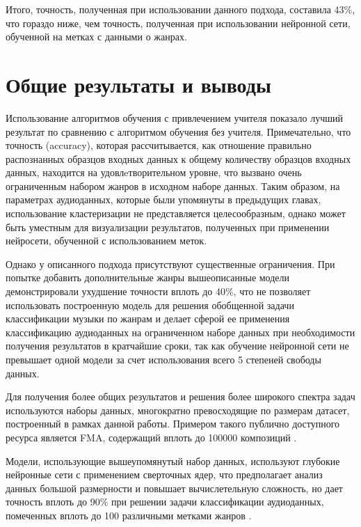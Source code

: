 Итого, точность, полученная при использовании данного подхода, составила $43$\%, что гораздо ниже, чем точность, полученная при использовании нейронной сети, обученной на метках с данными о жанрах.

\section{Общие результаты и выводы}

Использование алгоритмов обучения с привлечением учителя показало лучший результат по сравнению с алгоритмом обучения без учителя.
Примечательно, что точность (accuracy), которая рассчитывается, как отношение правильно распознанных образцов входных данных к общему количеству образцов входных данных, находится на удовлeтворительном уровне, что вызвано
очень ограниченным набором жанров в исходном наборе данных. Таким образом, на параметрах аудиоданных, которые были упомянуты в предыдущих главах, использование кластеризации не представляется целесообразным, однако может быть уместным для визуализации результатов, полученных при применении нейросети, обученной с использованием меток.

Однако у описанного подхода присутствуют существенные ограничения. При попытке добавить дополнительные жанры вышеописанные модели демонстрировали ухудшение точности вплоть до 40\%, что
не позволяет использовать построенную модель для решения обобщенной задачи классификации музыки по жанрам и делает сферой ее применения
классификацию аудиоданных на ограниченном наборе данных при необходимости получения результатов в кратчайшие сроки, так как обучение нейронной сети не превышает одной модели за счет использования всего 5 степеней свободы данных.

Для получения более общих результатов и решения более широкого спектра задач используются наборы данных, многократно превосходящие
по размерам датасет, построенный в рамках данной работы. Примером такого публично доступного ресурса является FMA, содержащий вплоть до 100000 композиций \cite{fma}.

Модели, использующие вышеупомянутый набор данных, используют глубокие нейронные сети с применением сверточных ядер, что предполагает анализ данных большой размерности и повышает вычислетельную сложность, но дает
точность вплоть до 90\% при решении задачи классификации аудиоданных, помеченных вплоть до 100 различными метками жанров \cite{zero} \cite{kim}.


